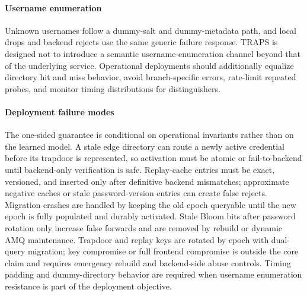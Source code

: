 \paragraph{Username enumeration}
Unknown usernames follow a dummy-salt and dummy-metadata path, and local drops and backend rejects use the same generic failure response. TRAPS is designed not to introduce a semantic username-enumeration channel beyond that of the underlying service. Operational deployments should additionally equalize directory hit and miss behavior, avoid branch-specific errors, rate-limit repeated probes, and monitor timing distributions for distinguishers.

\paragraph{Deployment failure modes}
The one-sided guarantee is conditional on operational invariants rather than on the learned model. A stale edge directory can route a newly active credential before its trapdoor is represented, so activation must be atomic or fail-to-backend until backend-only verification is safe. Replay-cache entries must be exact, versioned, and inserted only after definitive backend mismatches; approximate negative caches or stale password-version entries can create false rejects. Migration crashes are handled by keeping the old epoch queryable until the new epoch is fully populated and durably activated. Stale Bloom bits after password rotation only increase false forwards and are removed by rebuild or dynamic AMQ maintenance. Trapdoor and replay keys are rotated by epoch with dual-query migration; key compromise or full frontend compromise is outside the core claim and requires emergency rebuild and backend-side abuse controls. Timing padding and dummy-directory behavior are required when username enumeration resistance is part of the deployment objective.

